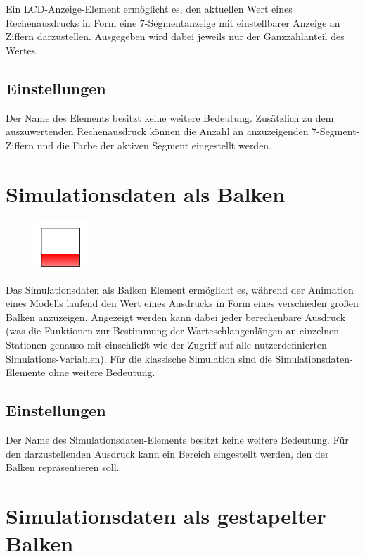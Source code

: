 Ein LCD-Anzeige-Element ermöglicht es, den aktuellen Wert eines Rechenausdrucks
in Form eine 7-Segmentanzeige mit einstellbarer Anzeige an Ziffern darzustellen.
Ausgegeben wird dabei jeweils nur der Ganzzahlanteil des Wertes.

\subsection*{Einstellungen}

Der Name des Elements besitzt keine weitere Bedeutung.
Zusätzlich zu dem auszuwertenden Rechenausdruck können
die Anzahl an anzuzeigenden 7-Segment-Ziffern und die
Farbe der aktiven Segment eingestellt werden.


\section{Simulationsdaten als Balken}
\label{ref:ModelElementAnimationBar}

\begin{figure}
\vspace{-22pt}
\includegraphics[width=2cm]{imageModelElementAnimationBar.png}
\vspace{-22pt}
\end{figure}

Das Simulationsdaten als Balken Element ermöglicht es, während der Animation eines Modells laufend den Wert
eines Ausdrucks in Form eines verschieden großen Balken anzuzeigen. Angezeigt werden kann dabei jeder berechenbare
Ausdruck (was die Funktionen zur Bestimmung der Warteschlangenlängen an einzelnen Stationen genauso mit einschließt
wie der Zugriff auf alle nutzerdefinierten Simulations-Variablen). Für die klassische Simulation sind die
Simulationsdaten-Elemente ohne weitere Bedeutung.

\subsection*{Einstellungen}

Der Name des Simulationsdaten-Elements besitzt keine weitere Bedeutung. Für den darzustellenden Ausdruck kann
ein Bereich eingestellt werden, den der Balken repräsentieren soll.


\section{Simulationsdaten als gestapelter Balken}
\label{ref:ModelElementAnimationBarStack}

